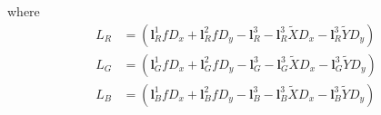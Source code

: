 where
\begin{equation}
\begin{split}
    L_R &= (\mathbf{l}_R^1 f D_x + \mathbf{l}_R^2 f D_y - \mathbf{l}_R^3- \mathbf{l}_R^3 \tilde{X} D_x - \mathbf{l}_R^3 \tilde{Y} D_y )\\
    L_G &= (\mathbf{l}_G^1 f D_x + \mathbf{l}_G^2 f D_y - \mathbf{l}_G^3- \mathbf{l}_G^3 \tilde{X} D_x - \mathbf{l}_G^3 \tilde{Y} D_y )\\
     L_B &= (\mathbf{l}_B^1 f D_x + \mathbf{l}_B^2 f D_y - \mathbf{l}_B^3- \mathbf{l}_B^3 \tilde{X} D_x - \mathbf{l}_B^3 \tilde{Y} D_y )\\
\end{split}
\end{equation}

